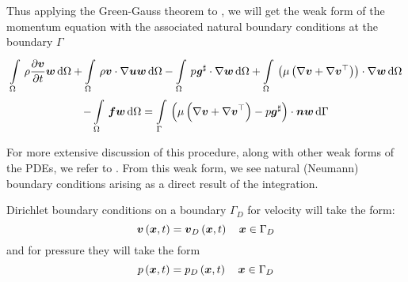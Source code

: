 Thus applying the Green-Gauss theorem to
, we will get
the weak form of the momentum equation with the associated natural boundary
conditions at the boundary $\Gamma$ \ie
\begin{multline}
  \gint{\Omega}{}{\rho\delby{\vectr{v}}{t}{\vectr{w}}}{\Omega}
  +\gint{\Omega}{}{\dotprod{\rho\vectr{v}}{\gradient{}{\vectr{u}}}\vectr{w}}{\Omega}
  -\gint{\Omega}{}{\dotprod{p\sharptensor{\tensor{g}}}{\gradient{}{\vectr{w}}}}{\Omega}
  +\gint{\Omega}{}{\dotprod{\pbrac{\mu\pbrac{\gradient{}{\vectr{v}}+\gradient{}{\transpose{\vectr{v}}}}}}{\gradient{}{\vectr{w}}}}{\Omega} \\
  -\gint{\Omega}{}{\vectr{f}\vectr{w}}{\Omega}
  =\gint{\Gamma}{}{\dotprod{\pbrac{\mu\pbrac{\gradient{}{\vectr{v}}+\transpose{\gradient{}{\vectr{v}}}}-
        p\sharptensor{\vectr{g}}}}{\vectr{n}}\vectr{w}}{\Gamma}
  \label{eqn:GalerkinNSE}
\end{multline}

For more extensive discussion of this procedure, along with other weak forms
of the PDEs, we refer to \cite{gresho:2000}. From this weak form, we see
natural (Neumann) boundary conditions arising as a direct result of the
integration.

Dirichlet boundary conditions on a boundary
$\Gamma_D$ for velocity will take the form:
\begin{equation}
  \fnof{\vectr{v}}{\vectr{x},t} = \fnof{\vectr{v}_{D}}{\vectr{x},t} \quad \vectr{x}\in\Gamma_{D}\\
  \label{eqn:NSEVelocityDirichletBC} 
\end{equation}
and for pressure they will take the form
\begin{equation}
  \fnof{p}{\vectr{x},t} = \fnof{p_{D}}{\vectr{x},t} \quad \vectr{x}\in\Gamma_{D}\\
  \label{eqn:NSEPressureDirichletBC} 
\end{equation}

